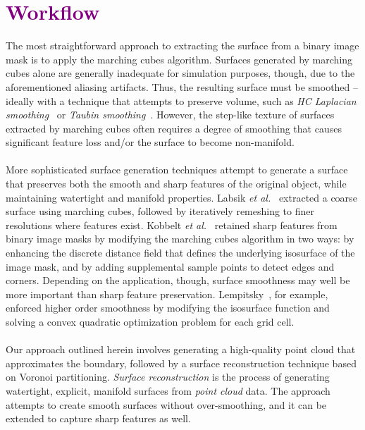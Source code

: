 \section{\textcolor{purple}{Workflow}}
%
The most straightforward approach to extracting the surface from a binary image mask is to apply the marching cubes algorithm. Surfaces generated by marching cubes alone are generally inadequate for simulation purposes, though, due to the aforementioned aliasing artifacts. Thus, the resulting surface must be smoothed -- ideally with a technique that attempts to preserve volume, such as \textit{HC Laplacian smoothing}~\cite{vollmer_1999} or \textit{Taubin smoothing}~\cite{taubin1995signal, taubin_1995}. However, the step-like texture of surfaces extracted by marching cubes often requires a degree of smoothing that causes significant feature loss and/or the surface to become non-manifold. \\ \\ 
%
More sophisticated surface generation techniques attempt to generate a surface that preserves both the smooth and sharp features of the original object, while maintaining watertight and manifold properties. Labsik \textit{et al.}~\cite{labsik_2002} extracted a coarse surface using marching cubes, followed by iteratively remeshing to finer resolutions where features exist. Kobbelt \textit{et al.}~\cite{kobbelt_2001} retained sharp features from binary image masks by modifying the marching cubes algorithm in two ways: by enhancing the discrete distance field that defines the underlying isosurface of the image mask, and by adding supplemental sample points to detect edges and corners. Depending on the application, though, surface smoothness may well be more important than sharp feature preservation. Lempitsky~\cite{lempitsky_2010}, for example, enforced higher order smoothness by modifying the isosurface function and solving a convex quadratic optimization problem for each grid cell. \\ \\ 
%
Our approach outlined herein involves generating a high-quality point cloud that approximates the boundary, followed by a surface reconstruction technique based on Voronoi partitioning. \textit{Surface reconstruction} is the process of generating watertight, explicit, manifold surfaces from \textit{point cloud} data. The approach attempts to create smooth surfaces without over-smoothing, and it can be extended to capture sharp features as well.
